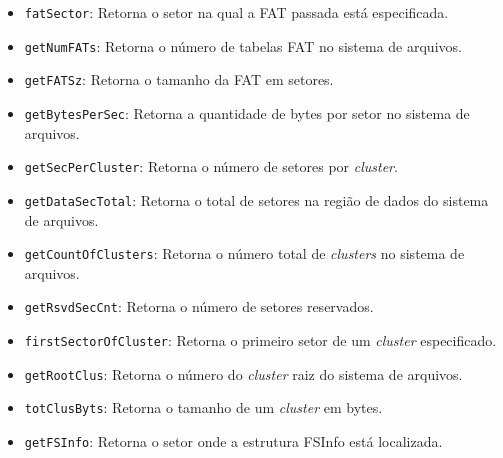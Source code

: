 \documentclass[
    12pt,				%
    oneside,   	        %
    a4paper,			%
    english,			%
    french,				%
    spanish,			%
    brazil,				%
    ]{pacotes/abntex2}
\begin{document}
\begin{itemize}
\begin{itemize}
            \item \texttt{fatSector}: Retorna o setor na qual a FAT passada está especificada.
            \item \texttt{getNumFATs}: Retorna o número de tabelas FAT no sistema de arquivos.
            \item \texttt{getFATSz}: Retorna o tamanho da FAT em setores.
            \item \texttt{getBytesPerSec}: Retorna a quantidade de bytes por setor no sistema de arquivos.
            \item \texttt{getSecPerCluster}: Retorna o número de setores por \textit{cluster}.
            \item \texttt{getDataSecTotal}: Retorna o total de setores na região de dados do sistema de arquivos.
            \item \texttt{getCountOfClusters}: Retorna o número total de \textit{clusters} no sistema de arquivos.
            \item \texttt{getRsvdSecCnt}: Retorna o número de setores reservados.
            \item \texttt{firstSectorOfCluster}: Retorna o primeiro setor de um \textit{cluster} especificado.
            \item \texttt{getRootClus}: Retorna o número do \textit{cluster} raiz do sistema de arquivos.
            \item \texttt{totClusByts}: Retorna o tamanho de um \textit{cluster} em bytes.
            \item \texttt{getFSInfo}: Retorna o setor onde a estrutura FSInfo está localizada.
        \end{itemize}
\end{itemize}
\end{document}
